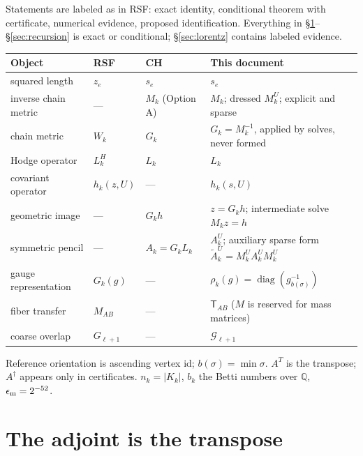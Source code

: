 \documentclass[11pt]{article}
\theoremstyle{definition}
\theoremstyle{plain}
\theoremstyle{remark}
\newcommand{\diag}{\operatorname{diag}}
\newcommand{\Tr}{^{T}}
\newcommand{\At}{\widetilde{A}}
\newcommand{\Tp}{\mathsf{T}}
\begin{document}
Statements are labeled as in RSF: exact identity, conditional theorem with certificate, numerical evidence, proposed identification. Everything in \S\ref{sec:adjoint}--\S\ref{sec:recursion} is exact or conditional; \S\ref{sec:lorentz} contains labeled evidence.

\begin{center}\small
\begin{tabular}{@{}llll@{}}
\toprule
Object & RSF & CH & This document \\
\midrule
squared length & \(z_e\) & \(s_e\) & \(s_e\) \\
inverse chain metric & --- & \(M_k\) (Option A) & \(M_k\); dressed \(M_k^{U}\); explicit and sparse \\
chain metric & \(W_k\) & \(G_k\) & \(G_k=M_k^{-1}\), applied by solves, never formed \\
Hodge operator & \(L_k^{H}\) & \(L_k\) & \(L_k\) \\
covariant operator & \(h_k(z,U)\) & --- & \(h_k(s,U)\) \\
geometric image & --- & \(G_kh\) & \(z=G_kh\); intermediate solve \(M_kz=h\) \\
symmetric pencil & --- & \(A_k=G_kL_k\) & \(A_k^{U}\); auxiliary sparse form \(\At_k^{U}=M_k^{U}A_k^{U}M_k^{U}\) \\
gauge representation & \(G_k(g)\) & --- & \(\rho_k(g)=\diag(g_{b(\sigma)}^{-1})\) \\
fiber transfer & \(M_{AB}\) & --- & \(\Tp_{AB}\) (\(M\) is reserved for mass matrices) \\
coarse overlap & \(G_{\ell+1}\) & --- & \(\mathcal G_{\ell+1}\) \\
\bottomrule
\end{tabular}
\end{center}
Reference orientation is ascending vertex id; \(b(\sigma)=\min\sigma\). \(A\Tr\) is the transpose; \(A^{\dagger}\) appears only in certificates. \(n_k=|K_k|\), \(b_k\) the Betti numbers over \(\mathbb Q\), \(\epsilon_{\rm m}=2^{-52}\).

\section{The adjoint is the transpose}\label{sec:adjoint}
\end{document}
